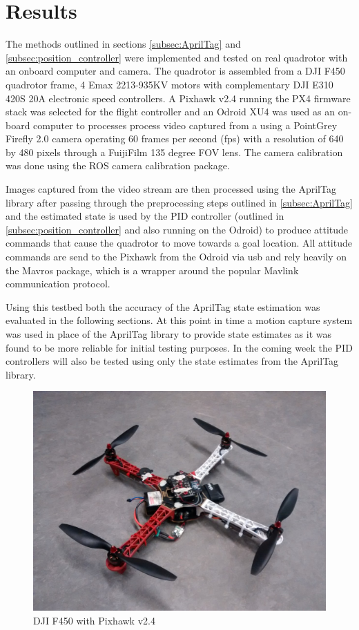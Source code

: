 \documentclass[11pt, twocolumn]{article}
\begin{document}
\section{Results}
The methods outlined in sections \ref{subsec:AprilTag} and \ref{subsec:position_controller} were implemented and tested on real quadrotor with an onboard computer and camera. The quadrotor is assembled from a DJI F450 quadrotor frame, 4 Emax 2213-935KV motors with complementary DJI E310 420S 20A electronic speed controllers. A Pixhawk v2.4 running the PX4 firmware stack was selected for the flight controller and an Odroid XU4 was used as an on-board computer to processes process video captured from a using a PointGrey Firefly 2.0 camera operating 60 frames per second (fps) with a resolution of 640 by 480 pixels through a FuijiFilm 135 degree FOV lens. The camera calibration was done using the ROS camera calibration package. 

Images captured from the video stream are then processed using the AprilTag library after passing through the preprocessing steps outlined in \ref{subsec:AprilTag} and the estimated state is used by the PID controller (outlined in \ref{subsec:position_controller} and also running on the Odroid) to produce attitude commands that cause the quadrotor to move towards a goal location. All attitude commands are send to the Pixhawk from the Odroid via usb and rely heavily on the Mavros package, which is a wrapper around the popular Mavlink communication protocol. 

Using this testbed both the accuracy of the AprilTag state estimation was evaluated in the following sections. At this point in time a motion capture system was used in place of the AprilTag library to provide state estimates as it was found to be more reliable for initial testing purposes. In the coming week the PID controllers will also be tested using only the state estimates from the AprilTag library. 


\begin{figure}[H]
	\centering
	\includegraphics[width=0.8\linewidth]{images/quadrotor.jpg}
	\caption{DJI F450 with Pixhawk v2.4}
	\label{Quadrotor}
\end{figure}
\end{document}
